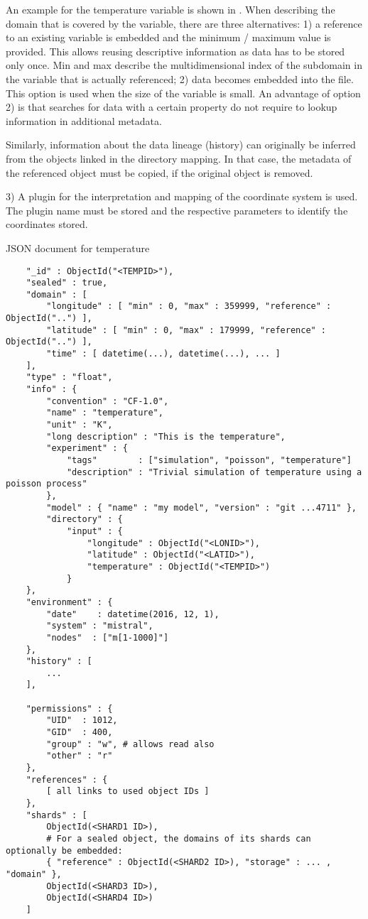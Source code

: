 An example for the temperature variable is shown in .
When describing the domain that is covered by the variable, there are three alternatives:
1) a reference to an existing variable is embedded and the minimum / maximum value is provided.
This allows reusing descriptive information as data has to be stored only once. Min and max describe the multidimensional index of the subdomain in the variable that is actually referenced;
2) data becomes embedded into the file. This option is used when the size of the variable is small.
An advantage of option 2) is that searches for data with a certain property do not require to lookup information in additional metadata.

Similarly, information about the data lineage (history) can originally be inferred from the objects linked in the directory mapping.
In that case, the metadata of the referenced object must be copied, if the original object is removed.

3) A plugin for the interpretation and mapping of the coordinate system is used.
The plugin name must be stored and the respective parameters to identify the coordinates stored.


\begin{tcbcode}[label={lst:mongotemperature}]{JSON document for temperature}
	\begin{lstlisting}
	"_id" : ObjectId("<TEMPID>"),
	"sealed" : true,
	"domain" : [
		"longitude" : [ "min" : 0, "max" : 359999, "reference" : ObjectId("..") ],
		"latitude" : [ "min" : 0, "max" : 179999, "reference" : ObjectId("..") ],
		"time" : [ datetime(...), datetime(...), ... ]
	],
	"type" : "float",
	"info" : {
		"convention" : "CF-1.0",
		"name" : "temperature",
		"unit" : "K",
		"long description" : "This is the temperature",
		"experiment" : {
			"tags"        : ["simulation", "poisson", "temperature"]
			"description" : "Trivial simulation of temperature using a poisson process"
		},
		"model" : { "name" : "my model", "version" : "git ...4711" },
		"directory" : {
			"input" : {
				"longitude" : ObjectId("<LONID>"),
				"latitude" : ObjectId("<LATID>"),
				"temperature" : ObjectId("<TEMPID>")
			}
	},
	"environment" : {
		"date"    : datetime(2016, 12, 1),
		"system" : "mistral",
		"nodes"  : ["m[1-1000]"]
	},
	"history" : [
		...
	],

	"permissions" : {
		"UID"  : 1012,
		"GID"  : 400,
		"group" : "w", # allows read also
		"other" : "r"
	},
	"references" : {
		[ all links to used object IDs ]
	},
	"shards" : [
		ObjectId(<SHARD1 ID>),
		# For a sealed object, the domains of its shards can optionally be embedded:
		{ "reference" : ObjectId(<SHARD2 ID>), "storage" : ... , "domain" },
		ObjectId(<SHARD3 ID>),
		ObjectId(<SHARD4 ID>)
	]
	\end{lstlisting}
\end{tcbcode}

